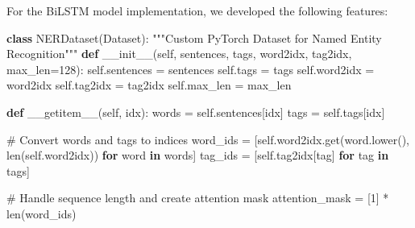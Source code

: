 \documentclass[
]{article}
\newenvironment{Shaded}{\begin{snugshade}}{\end{snugshade}}
\newcommand{\BuiltInTok}[1]{\textcolor[rgb]{0.00,0.23,0.31}{#1}}
\newcommand{\CommentTok}[1]{\textcolor[rgb]{0.37,0.37,0.37}{#1}}
\newcommand{\ControlFlowTok}[1]{\textcolor[rgb]{0.00,0.23,0.31}{\textbf{#1}}}
\newcommand{\DecValTok}[1]{\textcolor[rgb]{0.68,0.00,0.00}{#1}}
\newcommand{\FunctionTok}[1]{\textcolor[rgb]{0.28,0.35,0.67}{#1}}
\newcommand{\KeywordTok}[1]{\textcolor[rgb]{0.00,0.23,0.31}{\textbf{#1}}}
\newcommand{\NormalTok}[1]{\textcolor[rgb]{0.00,0.23,0.31}{#1}}
\newcommand{\OperatorTok}[1]{\textcolor[rgb]{0.37,0.37,0.37}{#1}}
\newcommand{\VariableTok}[1]{\textcolor[rgb]{0.07,0.07,0.07}{#1}}
\begin{document}
For the BiLSTM model implementation, we developed the following
features:

\begin{Shaded}
\begin{Highlighting}[]
\KeywordTok{class}\NormalTok{ NERDataset(Dataset):}
    \CommentTok{"""Custom PyTorch Dataset for Named Entity Recognition"""}
    \KeywordTok{def} \FunctionTok{\_\_init\_\_}\NormalTok{(}\VariableTok{self}\NormalTok{, sentences, tags, word2idx, tag2idx, max\_len}\OperatorTok{=}\DecValTok{128}\NormalTok{):}
        \VariableTok{self}\NormalTok{.sentences }\OperatorTok{=}\NormalTok{ sentences}
        \VariableTok{self}\NormalTok{.tags }\OperatorTok{=}\NormalTok{ tags}
        \VariableTok{self}\NormalTok{.word2idx }\OperatorTok{=}\NormalTok{ word2idx}
        \VariableTok{self}\NormalTok{.tag2idx }\OperatorTok{=}\NormalTok{ tag2idx}
        \VariableTok{self}\NormalTok{.max\_len }\OperatorTok{=}\NormalTok{ max\_len}
    
    \KeywordTok{def} \FunctionTok{\_\_getitem\_\_}\NormalTok{(}\VariableTok{self}\NormalTok{, idx):}
\NormalTok{        words }\OperatorTok{=} \VariableTok{self}\NormalTok{.sentences[idx]}
\NormalTok{        tags }\OperatorTok{=} \VariableTok{self}\NormalTok{.tags[idx]}
        
        \CommentTok{\# Convert words and tags to indices}
\NormalTok{        word\_ids }\OperatorTok{=}\NormalTok{ [}\VariableTok{self}\NormalTok{.word2idx.get(word.lower(), }\BuiltInTok{len}\NormalTok{(}\VariableTok{self}\NormalTok{.word2idx)) }\ControlFlowTok{for}\NormalTok{ word }\KeywordTok{in}\NormalTok{ words]}
\NormalTok{        tag\_ids }\OperatorTok{=}\NormalTok{ [}\VariableTok{self}\NormalTok{.tag2idx[tag] }\ControlFlowTok{for}\NormalTok{ tag }\KeywordTok{in}\NormalTok{ tags]}
        
        \CommentTok{\# Handle sequence length and create attention mask}
\NormalTok{        attention\_mask }\OperatorTok{=}\NormalTok{ [}\DecValTok{1}\NormalTok{] }\OperatorTok{*} \BuiltInTok{len}\NormalTok{(word\_ids)}
        

\end{Highlighting}
\end{Shaded}
\end{document}
